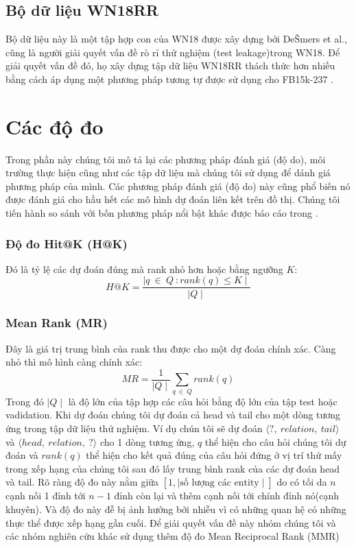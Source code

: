 \subsection{Bộ dữ liệu WN18RR}

Bộ dữ liệu này là một tập hợp con của WN18 được xây dựng bởi DeŠmers et al.\cite{dettmers2017convolutional}, cũng là người giải quyết vấn đề rò rỉ thử nghiệm (test leakage)trong WN18. Để giải quyết vấn đề đó, họ xây dựng tập dữ liệu WN18RR thách thức hơn nhiều bằng cách áp dụng một phương pháp tương tự được sử dụng cho FB15k-237 \cite{toutanova2015observed}. 


\section{Các độ đo}
Trong phần này chúng tôi mô tả lại các phương pháp đánh giá (độ do), môi trường thực hiện cũng như các tập dữ liệu mà chúng tôi sử dụng để dánh giá phương pháp của mình. Các phương pháp đánh giá (độ do) này cũng phổ biến nó được đánh giá cho hầu hết các mô hình dự đoán liên kết trên đồ thị. Chúng tôi tiến hành so sánh với bốn phương pháp nổi bật khác được báo cáo trong \cite{rossi2020knowledge}.

\subsubsection{Độ đo Hit@K (H@K)}

Đó là tỷ lệ các dự đoán đúng mà rank nhỏ hơn hoặc bằng ngưỡng \(K\):
\[H@K = \frac{\mid {q ~\in ~Q~: rank(q) \leq K} \mid}{\mid Q \mid}\]

\subsubsection{Mean Rank (MR)}

Đây là giá trị trung bình của rank thu được cho một dự đoán chính xác. Càng nhỏ thì mô hình càng chính xác:
\[MR = \frac{1}{\mid Q \mid} \sum_{q ~\in~ Q} rank(q) \]
Trong đó \(\mid Q \mid\) là độ lớn của tập hợp các câu hỏi bằng độ lớn của tập test hoặc vadidation. Khi dự đoán chúng tôi dự đoán cả head và tail cho một dòng tương ứng trong tập dữ liệu thử nghiệm. Ví dụ chún tôi sẽ dự đoán \(\langle ?,~ relation,~ tail \rangle\) và \(\langle head,~ relation,~ ?\rangle\) cho 1 dòng tương ứng, \(q\) thể hiện cho câu hỏi chúng tôi dự đoán và \(rank(q)\) thể hiện cho kết quả đúng của câu hỏi đứng ở vị trí thứ mấy trong xếp hạng của chúng tôi sau đó lấy trung bình rank của các dự đoán head và tail. Rõ ràng độ đo này nằm giữa \([1, \mid \text{số lượng các entity} \mid]\) do có tối da \(n\) cạnh nối 1 đỉnh tới \(n-1\) đỉnh còn lại và thêm cạnh nối tới chính đỉnh nó(cạnh khuyên). Và độ đo này đễ bị ảnh hưởng bởi nhiễu vì có những quan hệ có những thực thể được xếp hạng gần cuối. Để giải quyết vấn đề này nhóm chúng tôi và các nhóm nghiên cứu khác sử dụng thêm độ đo Mean Reciprocal Rank (MMR)

